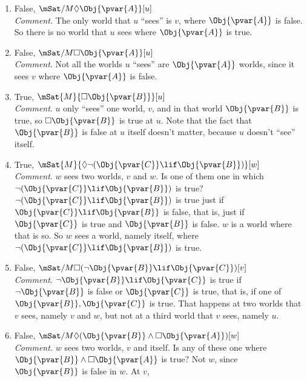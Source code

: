 \documentclass[../../../include/open-logic-section]{subfiles}
\begin{document}
\begin{prob}
\begin{ans}
        \begin{enumerate}
        \item False, $\mSat/{M}{\Diamond \Obj{\pvar{A}}}[u]$\\
        \emph{Comment. }The only world that $u$ ``sees'' is $v$,
        where $\Obj{\pvar{A}}$ is false. So there is no world that $u$ sees where
        $\Obj{\pvar{A}}$ is true.
        \item False, $\mSat/{M}{\Box \Obj{\pvar{A}}}[u]$\\
        \emph{Comment}. Not all the worlds $u$ ``sees'' are $\Obj{\pvar{A}}$ worlds,
        since it sees $v$ where $\Obj{\pvar{A}}$  is false.
        \item True, $\mSat{M}{\Box \Obj{\pvar{B}}}[u]$\\
        \emph{Comment}. $u$ only ``sees'' one world, $v$, and in that world
        $\Obj{\pvar{B}}$ is true, so $\Box \Obj{\pvar{B}}$ is true at $u$. Note that the fact
        that $\Obj{\pvar{B}}$ is false at $u$ itself doesn't matter, because $u$
        doesn't ``see'' itself. 
        \item True,  $\mSat{M}{\Diamond\lnot(\Obj{\pvar{C}}\lif \Obj{\pvar{B}})}[w]$\\
        \emph{Comment}. $w$ sees two worlds, $v$ and $w$. Is
        one of them one in which $\lnot(\Obj{\pvar{C}}\lif \Obj{\pvar{B}})$ is true? 
        $\lnot(\Obj{\pvar{C}}\lif \Obj{\pvar{B}})$ is true just if $\Obj{\pvar{C}}\lif \Obj{\pvar{B}}$
        is false, that is, just if $\Obj{\pvar{C}}$ is true and $\Obj{\pvar{B}}$ is
        false. $w$ is a world where that is so. So $w$ sees a world,
        namely itself, where $\lnot(\Obj{\pvar{C}}\lif \Obj{\pvar{B}})$ is true. 
        \item False, 	$\mSat/{M}{\Box(\lnot \Obj{\pvar{B}}\lif \Obj{\pvar{C}})}[v]$\\
        \emph{Comment}. $\lnot \Obj{\pvar{B}}\lif \Obj{\pvar{C}}$ is true if $\lnot\Obj{\pvar{B}}$ 
        is false or $\Obj{\pvar{C}}$ is true, that is, if one of $\Obj{\pvar{B}}, \Obj{\pvar{C}}$ 
        is true. That happens at two worlds that $v$ sees, namely $v$
        and $w$, but not at a third world that $v$ sees, namely $u$. 
        \item False, $\mSat/{M}{\Diamond(\Obj{\pvar{B}}\land\Box \Obj{\pvar{A}})}[w]$\\
        \emph{Comment. }$w$ sees two worlds, $v$ and itself. Is
        any of these one where $\Obj{\pvar{B}}\land\Box \Obj{\pvar{A}}$ is true? Not $w$, since
        $\Obj{\pvar{B}}$ is false in $w$. At $v$,

\end{enumerate}
\end{ans}
\end{prob}
\end{document}
